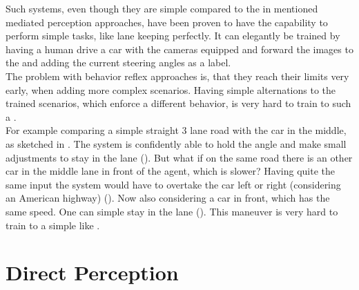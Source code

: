 Such systems, even though they are simple compared to the in  mentioned mediated perception approaches, have been proven to have the capability to perform simple tasks, like lane keeping perfectly. It can elegantly be trained by having a human drive a car with the cameras equipped and forward the images to the \nn and adding the current steering angles as a label.\cite{chen2015deepdriving}\\

The problem with behavior reflex approaches is, that they reach their limits very early, when adding more complex scenarios. Having simple alternations to the trained scenarios, which enforce a different behavior, is very hard to train to such a \nn.\\
For example comparing a simple straight 3 lane road with the car in the middle, as sketched in . The system is confidently able to hold the angle and make small adjustments to stay in the lane (). But what if on the same road there is an other car in the middle lane in front of the agent, which is slower? Having quite the same input the system would have to overtake the car left or right (considering an American highway) (). Now also considering a car in front, which has the same speed. One can simple stay in the lane (). This maneuver is very hard to train to a simple \nn like \alvinn.





\section{Direct Perception}\label{sec: Direct Perception}


